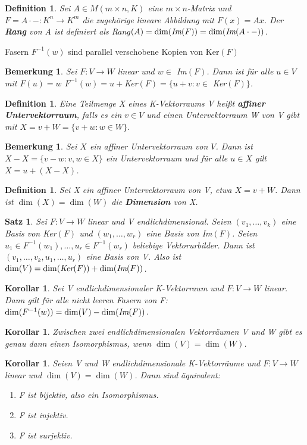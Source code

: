 \documentclass[12pt,a4paper]{article}
\theoremstyle{plain}
\newtheorem{Satz}[Theorem]{Satz}
\newtheorem{Korollar}[Theorem]{Korollar}
\newtheorem{Definition}[Theorem]{Definition}
\newtheorem{Bemerkung}[Theorem]{Bemerkung}
\newcommand{\herv}[1]{{\emph{\textbf{#1}}}}
\numberwithin{equation}{section}
\begin{document}
\begin{Definition}
Sei $A\in M(m\times n, K)$ eine $m\times n$-Matrix und $F=A\cdot -: K^n\rightarrow K^m$ die zugehörige lineare Abbildung mit $F(x)=A x$. Der \herv{Rang} von A ist definiert als \emph{Rang}$(A)=\dim(\emph{Im}(F))=\dim(\emph{Im}(A\cdot -))$.
\end{Definition}
\glqq Fasern $F^{-1}(w)$ sind parallel verschobene Kopien von Ker$(F)$\grqq
\begin{Bemerkung}
Sei $F:V\rightarrow W$ linear und $w\in$ Im$(F)$. Dann ist für alle $u \in V$ mit $F(u)=w$ $F^{-1}(w)=u+$Ker$(F)=\{u+v: v \in $ Ker$(F)\}$.
\end{Bemerkung}
\begin{Definition}
Eine Teilmenge X eines K-Vektorraums V heißt \herv{affiner Untervektorraum}, falls es ein $v\in V$ und einen Untervektorraum W von V gibt mit $X=v+W=\{v+w: w\in W\}$.
\end{Definition}
\begin{Bemerkung}
Sei $X$ ein affiner Untervektorraum von $V$. Dann ist $X-X=\{v-w: v,w\in X\}$ ein Untervektorraum und für alle $u\in X$ gilt $X=u+(X-X)$.
\end{Bemerkung}
\begin{Definition}
Sei X ein affiner Untervektorraum von V, etwa $X=v+W$. Dann ist $\dim(X)=\dim(W)$ die \herv{Dimension} von X.
\end{Definition}
\begin{Satz}
Sei $F: V \rightarrow W$ linear und V endlichdimensional. Seien $(v_1,\ldots,v_k)$ eine Basis von \emph{Ker}$(F)$ und $(w_1,\ldots,w_r)$ eine Basis von \emph{Im}$(F)$. Seien $u_1\in F^{-1}(w_1),\ldots,u_r\in F^{-1}(w_r)$ beliebige Vektorurbilder. Dann ist $(v_1,\ldots,v_k,u_1,\ldots,u_r)$ eine Basis von V. Also ist $\dim(V)=\dim(\emph{Ker}(F))+\dim(\emph{Im}(F))$.
\end{Satz}
\begin{Korollar}
Sei V endlichdimensionaler K-Vektorraum und $F:V\rightarrow W$ linear. Dann gilt für alle nicht leeren Fasern von F: $\dim(F^{-1}(w))=\dim(V)-\dim(\emph{Im}(F))$.
\end{Korollar}
\begin{Korollar}
Zwischen zwei endlichdimensionalen Vektorräumen V und W gibt es genau dann einen Isomorphismus, wenn $\dim(V)=\dim(W)$.
\end{Korollar}
\begin{Korollar}
Seien V und W endlichdimensionale K-Vektorräume und $F: V\rightarrow W$ linear und $\dim(V)=\dim(W)$. Dann sind äquivalent:
\begin{enumerate}
\renewcommand{\labelenumi}{\emph{(\roman{enumi})}}
\item F ist bijektiv, also ein Isomorphismus.
\item F ist injektiv.
\item F ist surjektiv.
\end{enumerate}
\end{Korollar}
\end{document}
